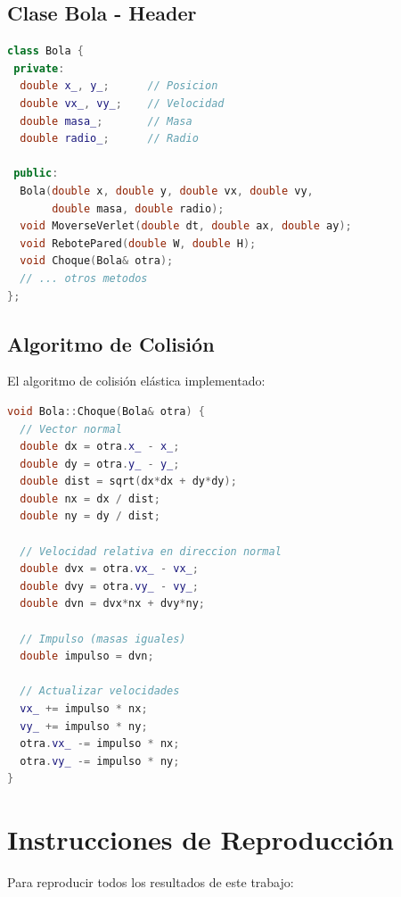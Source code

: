 \documentclass[12pt,a4paper]{article}
\begin{document}
\subsection{Clase Bola - Header}

\begin{lstlisting}[language=C++, basicstyle=\small\ttfamily, 
                   keywordstyle=\color{blue}, commentstyle=\color{gray}]
class Bola {
 private:
  double x_, y_;      // Posicion
  double vx_, vy_;    // Velocidad
  double masa_;       // Masa
  double radio_;      // Radio
  
 public:
  Bola(double x, double y, double vx, double vy, 
       double masa, double radio);
  void MoverseVerlet(double dt, double ax, double ay);
  void RebotePared(double W, double H);
  void Choque(Bola& otra);
  // ... otros metodos
};
\end{lstlisting}

\subsection{Algoritmo de Colisión}

El algoritmo de colisión elástica implementado:

\begin{lstlisting}[language=C++, basicstyle=\small\ttfamily]
void Bola::Choque(Bola& otra) {
  // Vector normal
  double dx = otra.x_ - x_;
  double dy = otra.y_ - y_;
  double dist = sqrt(dx*dx + dy*dy);
  double nx = dx / dist;
  double ny = dy / dist;
  
  // Velocidad relativa en direccion normal
  double dvx = otra.vx_ - vx_;
  double dvy = otra.vy_ - vy_;
  double dvn = dvx*nx + dvy*ny;
  
  // Impulso (masas iguales)
  double impulso = dvn;
  
  // Actualizar velocidades
  vx_ += impulso * nx;
  vy_ += impulso * ny;
  otra.vx_ -= impulso * nx;
  otra.vy_ -= impulso * ny;
}
\end{lstlisting}

\section{Instrucciones de Reproducción}

Para reproducir todos los resultados de este trabajo:
\end{document}
